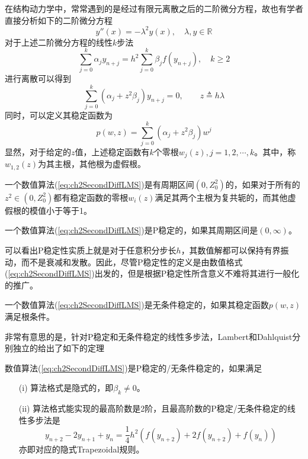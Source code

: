 在结构动力学中，常常遇到的是经过有限元离散之后的二阶微分方程，故也有学者直接分析如下的二阶微分方程
\begin{equation}
y''(x)=-\lambda^2y(x),\quad \lambda,y\in\mathbb{R}
\end{equation}
对于上述二阶微分方程的线性$k$步法
\begin{equation}
\sum_{j=0}^{k}\alpha_jy_{n+j}=h^2\sum_{j=0}^{k}\beta_jf(y_{n+j}),\quad k\ge2\label{eq:ch2SecondDiffLMS}
\end{equation}
进行离散可以得到\begin{equation}
\sum_{j=0}^{k}(\alpha_j+z^2\beta_j)y_{n+j}=0,\qquad z\triangleq h\lambda
\end{equation}
同时，可以定义其稳定函数为\begin{equation}
p(w,z)=\sum_{j=0}^{k}(\alpha_j+z^2\beta_j)w^j
\end{equation}
显然，对于给定的$z$值，上述稳定函数有$k$个零根$w_j(z),j=1,2,\cdots,k$。其中，称$w_{1,2}(z)$为其主根，其他根为虚假根。
\begin{definition}[周期区间]
一个数值算法(\ref{eq:ch2SecondDiffLMS})是有周期区间$(0,Z_0^2)$的\cite{Lambert1976a}，如果对于所有的$z^2\in(0,Z_0^2)$都有稳定函数的零根$w_i(z)$满足其两个主根为复共轭的，而其他虚假根的模值小于等于1。
\end{definition}
\begin{definition}[P稳定性]
一个数值算法(\ref{eq:ch2SecondDiffLMS})是P稳定的\cite{Lambert1976a}，如果其周期区间是$(0,\infty)$。
\end{definition}
可以看出P稳定性实质上就是对于任意积分步长$h$，其数值解都可以保持有界振动，而不是衰减和发散。因此，尽管P稳定性的定义是由数值格式(\ref{eq:ch2SecondDiffLMS})出发的，但是根据P稳定性所含意义不难将其进行一般化的推广。

\begin{definition}[无条件稳定性]
一个数值算法(\ref{eq:ch2SecondDiffLMS})是无条件稳定的\cite{Dahlquist1978a}，如果其稳定函数$p(w,z)$满足根条件。
\end{definition}
非常有意思的是，针对P稳定和无条件稳定的线性多步法，Lambert\cite{Lambert1976a}和Dahlquist\cite{Dahlquist1978a}分别独立的给出了如下的定理
\begin{theorem}
数值算法(\ref{eq:ch2SecondDiffLMS})是P稳定的/无条件稳定的，如果满足
\begin{itemize}
\item[(i)] 算法格式是隐式的，即$\beta_k\neq0$。
\item[(ii)] 算法格式能实现的最高阶数是2阶，且最高阶数的P稳定/无条件稳定的线性多步法是
\begin{equation}
y_{n+2}-2y_{n+1}+y_n=\frac{1}{4}h^2(f(y_{n+2})+2f(y_{n+2})+f(y_n))
\end{equation}
亦即对应的隐式Trapezoidal规则。
\end{itemize}
\end{theorem}

